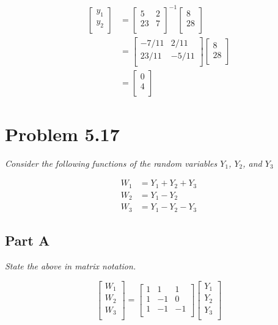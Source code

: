 \documentclass[12pt, letterpaper]{article}
\begin{document}
\begin{align*}
\begin{bmatrix}
y_{1} \\
y_{2} \\
\end{bmatrix} &= 
\begin{bmatrix}
5 & 2 \\
23 & 7 \\
\end{bmatrix}^{-1}
\begin{bmatrix}
8 \\
28 \\
\end{bmatrix} \\
&= \begin{bmatrix}
-7/11 & 2/11 \\
23/11 & -5/11 \\
\end{bmatrix} 
\begin{bmatrix}
8 \\
28 \\
\end{bmatrix} \\
&= \begin{bmatrix}
0 \\
4 \\
\end{bmatrix}
\end{align*}

\section{Problem 5.17}
\textit{Consider the following functions of the random variables $Y_{1}$, $Y_{2}$, and $Y_{3}$}

\begin{align*}
	W_{1} &= Y_{1} + Y_{2} + Y_{3} \\
	W_{2} &= Y_{1} - Y_{2} \\
	W_{3} &= Y_{1} - Y_{2} - Y_{3}
\end{align*}

\subsection{Part A} 
\textit{State the above in matrix notation.}

\begin{equation*}
\begin{bmatrix}
 W_{1} \\
 W_{2} \\
 W_{3} \\
\end{bmatrix} = 
\begin{bmatrix}
 1 & 1 & 1 \\
 1 & -1 & 0 \\
 1 & -1 & -1 \\
\end{bmatrix} 
\begin{bmatrix}
 Y_{1} \\
 Y_{2} \\
 Y_{3} \\
\end{bmatrix}
\end{equation*}
\end{document}
